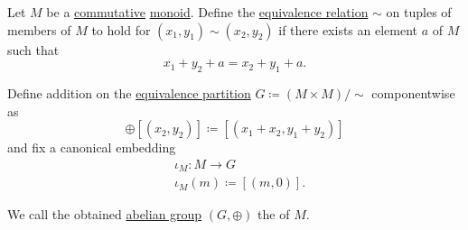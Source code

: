 \begin{definition}\label{def:monoid_completion}
  Let \( M \) be a \hyperref[def:magma/commutative]{commutative} \hyperref[def:unital_magma/monoid]{monoid}. Define the \hyperref[def:equivalence_relation]{equivalence relation} \( \sim \) on tuples of members of \( M \) to hold for \( (x_1, y_1) \sim (x_2, y_2) \) if there exists an element \( a \) of \( M \) such that
  \begin{equation*}
    x_1 + y_2 + a = x_2 + y_1 + a.
  \end{equation*}

  Define addition on the \hyperref[thm:equivalence_partition]{equivalence partition} \( G \coloneqq (M \times M) / \sim \) componentwise as
  \begin{equation*}
    [(x_1, y_1)] \oplus [(x_2, y_2)]
    \coloneqq
    [(x_1 + x_2, y_1 + y_2)]
  \end{equation*}
  and fix a canonical embedding
  \begin{equation*}
    \begin{aligned}
      &\iota_M: M \to G \\
      &\iota_M(m) \coloneqq [(m, 0)].
    \end{aligned}
  \end{equation*}

  We call the obtained \hyperref[def:abelian_group]{abelian group} \( (G, \oplus) \) the  of \( M \).
\end{definition}
